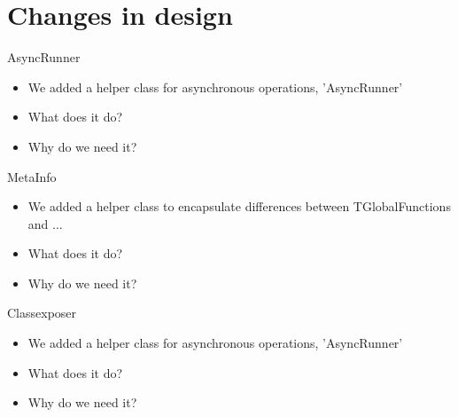 \section{Changes in design}

\begin{frame}{AsyncRunner}
	\begin{itemize}
		\item We added a helper class for asynchronous operations, 'AsyncRunner'
		\item What does it do?
		\item Why do we need it?
	\end{itemize}
\end{frame}

\begin{frame}{MetaInfo}
	\begin{itemize}
		\item We added a helper class to encapsulate differences between TGlobalFunctions and ...
		\item What does it do?
		\item Why do we need it?
	\end{itemize}
\end{frame}

\begin{frame}{Classexposer}
	\begin{itemize}
		\item We added a helper class for asynchronous operations, 'AsyncRunner'
		\item What does it do?
		\item Why do we need it?
	\end{itemize}
\end{frame}
